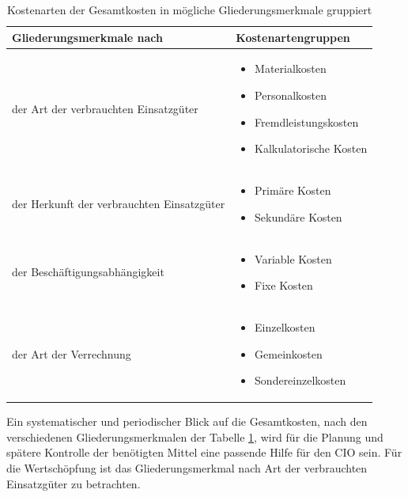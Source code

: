 \begin{table}[h!]
\begin{tabularx}{\textwidth}{|X|X|}
	\hline \textbf{Gliederungsmerkmale nach} & \textbf{Kostenartengruppen} \\ 
	\hline der Art der verbrauchten Einsatzgüter & \begin{itemize}
		\item Materialkosten
		\item Personalkosten
		\item Fremdleistungskosten
		\item Kalkulatorische Kosten
	\end{itemize} \\ 
	\hline der Herkunft der verbrauchten Einsatzgüter & \begin{itemize}
		\item Primäre Kosten
		\item Sekundäre Kosten	
	\end{itemize}  \\ 
	\hline der Beschäftigungsabhängigkeit & \begin{itemize}
		\item Variable Kosten
		\item Fixe Kosten
	\end{itemize} \\ 
	\hline der Art der Verrechnung & \begin{itemize}
		\item Einzelkosten
		\item Gemeinkosten
		\item Sondereinzelkosten
	\end{itemize} \\ 
	\hline 
\end{tabularx}
	\caption{Kostenarten der Gesamtkosten in mögliche Gliederungsmerkmale gruppiert}
	\label{tab_gliederung_kostenarten}
\end{table}

Ein systematischer und periodischer Blick auf die Gesamtkosten, nach den verschiedenen Gliederungsmerkmalen der Tabelle \ref{tab_gliederung_kostenarten}, wird f\"ur die Planung und sp\"atere Kontrolle der ben\"otigten Mittel eine passende Hilfe f\"ur den CIO sein. Für die Wertschöpfung ist das Gliederungsmerkmal nach Art der verbrauchten Einsatzgüter zu betrachten.











